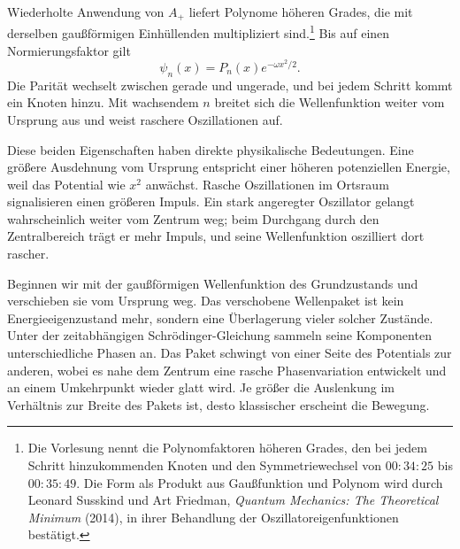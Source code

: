 Wiederholte Anwendung von \(A_{+}\) liefert Polynome höheren Grades, die mit derselben gaußförmigen Einhüllenden multipliziert sind.\footnote{Die Vorlesung nennt die Polynomfaktoren höheren Grades, den bei jedem Schritt hinzukommenden Knoten und den Symmetriewechsel von \(00{:}34{:}25\) bis \(00{:}35{:}49\). Die Form als Produkt aus Gaußfunktion und Polynom wird durch Leonard Susskind und Art Friedman, \emph{Quantum Mechanics: The Theoretical Minimum} (2014), in ihrer Behandlung der Oszillatoreigenfunktionen bestätigt.} Bis auf einen Normierungsfaktor gilt
\begin{equation}
\psi_{n}(x)=P_{n}(x)e^{-\omega x^{2}/2}.
\end{equation}
Die Parität wechselt zwischen gerade und ungerade, und bei jedem Schritt kommt ein Knoten hinzu. Mit wachsendem \(n\) breitet sich die Wellenfunktion weiter vom Ursprung aus und weist raschere Oszillationen auf.

Diese beiden Eigenschaften haben direkte physikalische Bedeutungen. Eine größere Ausdehnung vom Ursprung entspricht einer höheren potenziellen Energie, weil das Potential wie \(x^{2}\) anwächst. Rasche Oszillationen im Ortsraum signalisieren einen größeren Impuls. Ein stark angeregter Oszillator gelangt wahrscheinlich weiter vom Zentrum weg; beim Durchgang durch den Zentralbereich trägt er mehr Impuls, und seine Wellenfunktion oszilliert dort rascher.

\begin{classroomqa}
\end{classroomqa}

Beginnen wir mit der gaußförmigen Wellenfunktion des Grundzustands und verschieben sie vom Ursprung weg. Das verschobene Wellenpaket ist kein Energieeigenzustand mehr, sondern eine Überlagerung vieler solcher Zustände. Unter der zeitabhängigen Schr\"odinger-Gleichung sammeln seine Komponenten unterschiedliche Phasen an. Das Paket schwingt von einer Seite des Potentials zur anderen, wobei es nahe dem Zentrum eine rasche Phasenvariation entwickelt und an einem Umkehrpunkt wieder glatt wird. Je größer die Auslenkung im Verhältnis zur Breite des Pakets ist, desto klassischer erscheint die Bewegung.

